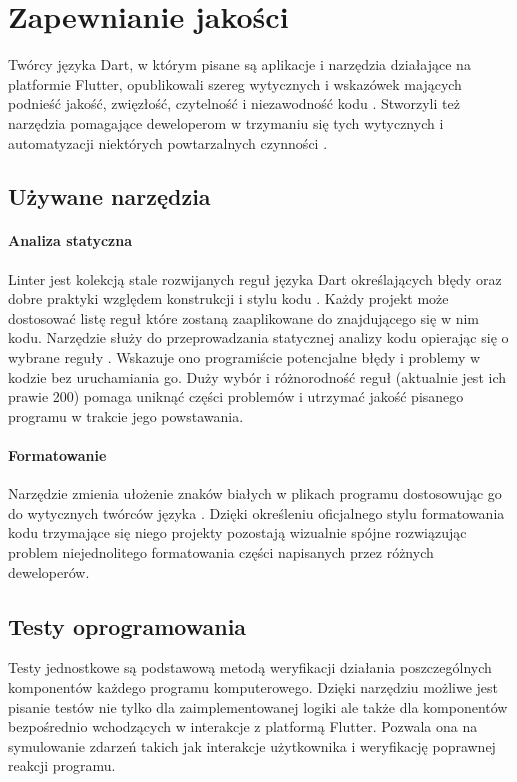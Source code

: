 \section{Zapewnianie jakości}
Twórcy języka Dart, w którym pisane są aplikacje i narzędzia działające na platformie Flutter, opublikowali szereg wytycznych i wskazówek mających podnieść jakość, zwięzłość, czytelność i niezawodność kodu \cite{Effective_Dart}. Stworzyli też narzędzia pomagające deweloperom w trzymaniu się tych wytycznych i automatyzacji niektórych powtarzalnych czynności \cite{Dart_SDK}.

\subsection{Używane narzędzia}

\paragraph{Analiza statyczna}
\label{par:static_analysis}
Linter jest kolekcją stale rozwijanych reguł języka Dart określających błędy oraz dobre praktyki względem konstrukcji i stylu kodu \cite{Dart_Lints}. Każdy projekt  może dostosować listę reguł które zostaną zaaplikowane do znajdującego się w nim kodu. Narzędzie  służy do przeprowadzania statycznej analizy kodu opierając się o wybrane reguły \cite{Dart_Analyze}. Wskazuje ono programiście potencjalne błędy i problemy w kodzie bez uruchamiania go. Duży wybór i różnorodność reguł (aktualnie jest ich prawie 200) pomaga uniknąć części problemów i utrzymać jakość pisanego programu w trakcie jego powstawania.

\paragraph{Formatowanie}
\label{par:dart_format}
Narzędzie  zmienia ułożenie znaków białych w plikach programu dostosowując go do wytycznych twórców języka \cite{Dart_Format}. Dzięki określeniu oficjalnego stylu formatowania kodu trzymające się niego projekty pozostają wizualnie spójne rozwiązując problem niejednolitego formatowania części napisanych przez różnych deweloperów.

\subsection{Testy oprogramowania}
Testy jednostkowe są podstawową metodą weryfikacji działania poszczególnych komponentów każdego programu komputerowego. Dzięki narzędziu  możliwe jest pisanie testów nie tylko dla zaimplementowanej logiki ale także dla komponentów bezpośrednio wchodzących w interakcje z platformą Flutter. Pozwala ona na symulowanie zdarzeń takich jak interakcje użytkownika i weryfikację poprawnej reakcji programu. 
 
